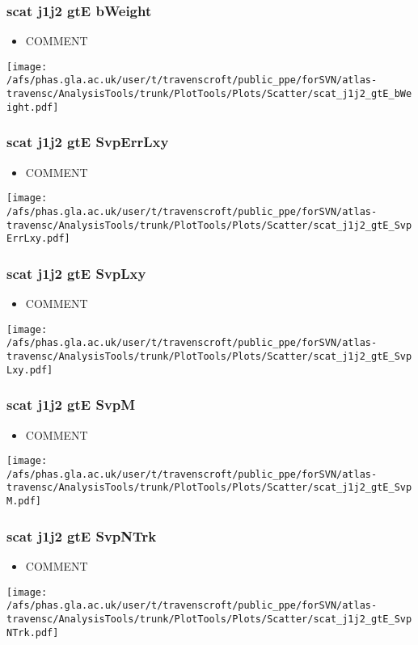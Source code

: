 \documentclass{beamer}
\begin{document}
\begin{frame}
\frametitle{scat j1j2 gtE bWeight}
\begin{itemize}
\item COMMENT
\end{itemize}
\begin{center}
\texttt{[image: /afs/phas.gla.ac.uk/user/t/travenscroft/public\_ppe/forSVN/atlas-travensc/AnalysisTools/trunk/PlotTools/Plots/Scatter/scat\_j1j2\_gtE\_bWeight.pdf]}
\end{center}
\end{frame}

\begin{frame}
\frametitle{scat j1j2 gtE SvpErrLxy}
\begin{itemize}
\item COMMENT
\end{itemize}
\begin{center}
\texttt{[image: /afs/phas.gla.ac.uk/user/t/travenscroft/public\_ppe/forSVN/atlas-travensc/AnalysisTools/trunk/PlotTools/Plots/Scatter/scat\_j1j2\_gtE\_SvpErrLxy.pdf]}
\end{center}
\end{frame}

\begin{frame}
\frametitle{scat j1j2 gtE SvpLxy}
\begin{itemize}
\item COMMENT
\end{itemize}
\begin{center}
\texttt{[image: /afs/phas.gla.ac.uk/user/t/travenscroft/public\_ppe/forSVN/atlas-travensc/AnalysisTools/trunk/PlotTools/Plots/Scatter/scat\_j1j2\_gtE\_SvpLxy.pdf]}
\end{center}
\end{frame}

\begin{frame}
\frametitle{scat j1j2 gtE SvpM}
\begin{itemize}
\item COMMENT
\end{itemize}
\begin{center}
\texttt{[image: /afs/phas.gla.ac.uk/user/t/travenscroft/public\_ppe/forSVN/atlas-travensc/AnalysisTools/trunk/PlotTools/Plots/Scatter/scat\_j1j2\_gtE\_SvpM.pdf]}
\end{center}
\end{frame}

\begin{frame}
\frametitle{scat j1j2 gtE SvpNTrk}
\begin{itemize}
\item COMMENT
\end{itemize}
\begin{center}
\texttt{[image: /afs/phas.gla.ac.uk/user/t/travenscroft/public\_ppe/forSVN/atlas-travensc/AnalysisTools/trunk/PlotTools/Plots/Scatter/scat\_j1j2\_gtE\_SvpNTrk.pdf]}
\end{center}
\end{frame}
\end{document}
